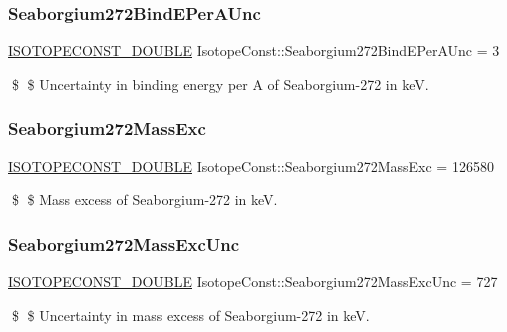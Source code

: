 \subsubsection{\texorpdfstring{Seaborgium272\+Bind\+E\+Per\+A\+Unc}{Seaborgium272BindEPerAUnc}}
{\footnotesize\ttfamily \mbox{\hyperlink{group___isotope_const-_macros_ga8f45a7272ce02c0b4c65c44636ed719a}{I\+S\+O\+T\+O\+P\+E\+C\+O\+N\+S\+T\+\_\+\+D\+O\+U\+B\+LE}} Isotope\+Const\+::\+Seaborgium272\+Bind\+E\+Per\+A\+Unc = 3}

\$ \$ Uncertainty in binding energy per A of Seaborgium-\/272 in keV. \mbox{\label{group___isotope_const-_seaborgium-_sg272_ga0f2dbd10783e07f8515c783f8fe9ca41}} 
\subsubsection{\texorpdfstring{Seaborgium272\+Mass\+Exc}{Seaborgium272MassExc}}
{\footnotesize\ttfamily \mbox{\hyperlink{group___isotope_const-_macros_ga8f45a7272ce02c0b4c65c44636ed719a}{I\+S\+O\+T\+O\+P\+E\+C\+O\+N\+S\+T\+\_\+\+D\+O\+U\+B\+LE}} Isotope\+Const\+::\+Seaborgium272\+Mass\+Exc = 126580}

\$ \$ Mass excess of Seaborgium-\/272 in keV. \mbox{\label{group___isotope_const-_seaborgium-_sg272_gaf8d1fd1bdad900869b13b36d7cab6c80}} 
\subsubsection{\texorpdfstring{Seaborgium272\+Mass\+Exc\+Unc}{Seaborgium272MassExcUnc}}
{\footnotesize\ttfamily \mbox{\hyperlink{group___isotope_const-_macros_ga8f45a7272ce02c0b4c65c44636ed719a}{I\+S\+O\+T\+O\+P\+E\+C\+O\+N\+S\+T\+\_\+\+D\+O\+U\+B\+LE}} Isotope\+Const\+::\+Seaborgium272\+Mass\+Exc\+Unc = 727}

\$ \$ Uncertainty in mass excess of Seaborgium-\/272 in keV. \mbox{\label{group___isotope_const-_seaborgium-_sg272_gadeacb127b2abc1451a3428bf0a27f9e9}} 

